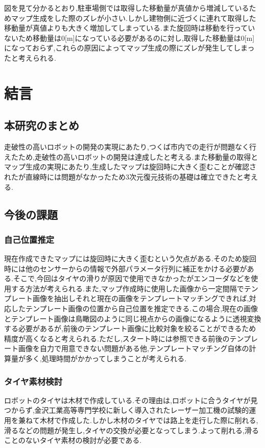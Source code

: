 \documentclass[12pt,oneside]{sotsuken_paper}
\begin{document}
図を見て分かるとおり,駐車場側では取得した移動量が真値から増減しているためマップ生成をした際のズレが小さい.しかし建物側に近づくに連れて取得した移動量が真値よりも大きく増加してしまっている.また旋回時は移動を行っていないため移動量は0[m]になっている必要があるのに対し,取得した移動量は0[m]になっておらず,これらの原因によってマップ生成の際にズレが発生してしまったと考えられる.

\chapter{結言}
\section{本研究のまとめ}
走破性の高いロボットの開発の実現にあたり,つくば市内での走行が問題なく行えたため,走破性の高いロボットの開発は達成したと考える.また移動量の取得とマップ生成の実現にあたり,生成したマップは旋回時に大きく歪むことが確認されたが直線時には問題がなかったため3次元復元技術の基礎は確立できたと考える.

\section{今後の課題}
\subsection{自己位置推定}
現在作成できたマップには旋回時に大きく歪むという欠点がある.そのため旋回時には他のセンサーからの情報で外部パラメータ行列に補正をかける必要がある.そこで,今回はタイヤの滑りが原因で使用できなかったがエンコーダなどを使用する方法が考えられる.また,マップ作成時に使用した画像から一定間隔でテンプレート画像を抽出しそれと現在の画像をテンプレートマッチングできれば,対応したテンプレート画像の位置から自己位置を推定できる.この場合,現在の画像とテンプレート画像は鳥瞰図のように同じ視点からの画像になるように透視変換する必要があるが,前後のテンプレート画像に比較対象を絞ることができるため精度が高くなると考えられる.ただし,スタート時には参照できる前後のテンプレート画像を自力で用意できない問題がある他,テンプレートマッチング自体の計算量が多く,処理時間がかかってしまうことが考えられる.

\subsection{タイヤ素材検討}
ロボットのタイヤは木材で作成している.その理由は,ロボットに合うタイヤが見つからず,金沢工業高等専門学校に新しく導入されたレーザー加工機の試験的運用を兼ねて木材で作成した.しかし木材のタイヤでは路上を走行した際に削れる,滑るなどの問題が発生し,タイヤの交換が必要となってしまう.よって削れる,滑ることのないタイヤ素材の検討が必要である.
\end{document}

